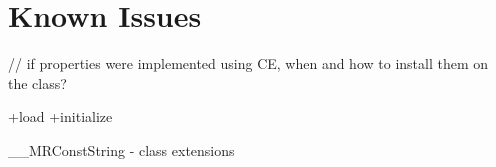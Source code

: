 \chapter{Known Issues}

// if properties were implemented using CE, when and how to install them on the class?

+load
+initialize

\_\_MRConstString - class extensions

